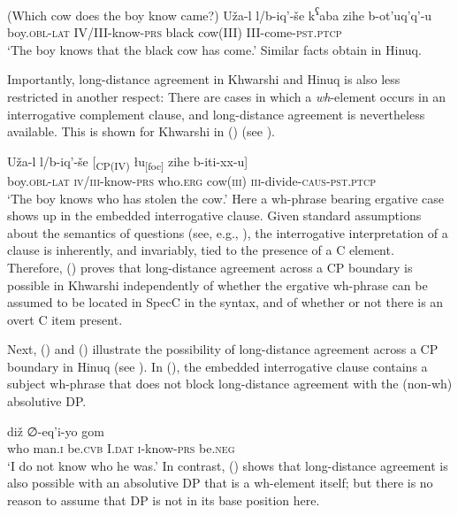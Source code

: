 \documentclass[output=paper
,modfonts
,nonflat]{langsci/langscibook}
\begin{document}
	\ea\label{ex:mueller:17}
	\ea (Which cow does the boy know came?)
	\ex\label{17-b}
	\gll  U\v{z}a-l l/b-iq'-\v{s}e k\textsuperscript{ʕ}aba zihe b-ot'uq'q'-u \\
	boy.{\scshape obl-lat} IV/III-know-{\scshape prs} black cow(III) III-come-{\scshape pst.ptcp} \\
	\glt `The boy knows that the black cow has come.'
	\z
	\z
	Similar facts obtain in Hinuq.  
	
	Importantly, long-distance agreement in Khwarshi and Hinuq is also less
	restricted in another respect:
	There are cases in which a {\em wh}-element occurs in
	an interrogative  complement clause, and long-distance agreement is nevertheless
	available. This is shown for Khwarshi in (\Next) (see \citealt{Khalilova07}). 
	
	\ea\label{ex:mueller:18}
	\gll U\v{z}a-l l/b-iq'-\v{s}e [\textsubscript{CP(IV)} \l \label{cp1}u\textsubscript{[foc]} zihe b-iti-xx-u] \\
	boy.{\scshape obl-lat} {\scshape iv/iii}-know-{\scshape prs} {} who.{\scshape erg} cow({\scshape iii}) {\scshape iii}-divide-{\scshape caus-pst.ptcp} \\
	\glt `The boy knows who has stolen the cow.'
	\z
	Here a wh-phrase bearing ergative case shows up in the embedded
	interrogative clause. Given standard assumptions about the
	semantics of questions (see, e.g., \citealt{Stechow:96:aga}),
	the interrogative interpretation of a clause is inherently, and
	invariably, tied to the presence of a C element. Therefore, (\Last)
	proves that long-distance agreement across a CP boundary is possible
	in Khwarshi independently of whether the ergative wh-phrase can be
	assumed to be located in SpecC in the syntax, and of whether or not
	there is an overt C item present. 
	
	Next, (\Next) and (\NNext) illustrate the possibility of long-distance
	agreement across a CP boundary in Hinuq (see \citealt{Forker:11}). In
	(\Next), the embedded interrogative clause contains a subject
	wh-phrase that does not block long-distance agreement with the
	(non-wh) absolutive DP. 
	
	\ea\label{ex:mueller:19} 
	\gll{} di\v{z} ∅-eq'i-yo gom \\
	{} who man.{\scshape i} be.{\scshape cvb} I.{\scshape dat} {\scshape i}-know-{\scshape prs}  be.{\scshape neg} \\ 
	\glt `I do not know who he was.'
	\z
	In contrast, (\Next) shows that long-distance agreement is also possible with
	an absolutive DP that is a wh-element itself; but there is no reason
	to assume that DP is not in its base position here. 
	
\end{document}

